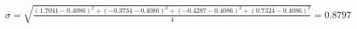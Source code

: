 \documentclass[preview]{standalone}
\begin{document}
\begin{align*}
\sigma = \sqrt{\frac{(1.7041 - 0.4086)^2 + (-0.3734 - 0.4086)^2 + (-0.4287 - 0.4086)^2 + (0.7324 - 0.4086)^2}{4}} = 0.8797
\end{align*}
\end{document}
